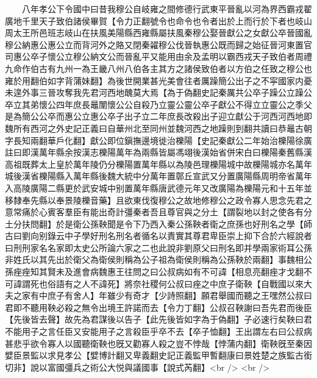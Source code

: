　　八年孝公下令國中曰昔我穆公自岐雍之間修德行武東平晉亂以河為界西霸戎翟廣地千里天子致伯諸侯畢賀【令力正翻號令也命令也令者出於上而行於下者也岐山周太王所邑班志岐山在扶風美陽縣西雍縣屬扶風秦穆公娶晉獻公之女獻公卒晉國亂穆公納惠公惠公立而背河外之賂又閉秦糴穆公伐晉執惠公既而歸之始征晉河東置官司惠公卒子懷公立穆公納文公而晉亂平又能用由余及孟明以霸西戎天子致伯者周禮九命作伯古有九州一為王畿八州八伯各主其方之諸侯致伯者以方伯之任致之穆公也雍於用翻伯如字背蒲妹翻】為後世開業甚光美會往者厲躁簡公出子之不寜國家内憂未遑外事三晉攻奪我先君河西地醜莫大焉【為于偽翻史記秦厲共公卒子躁公立躁公卒立其弟懷公四年庶長鼂闈懷公公自殺乃立靈公靈公卒子獻公不得立立靈公之季父是為簡公公卒而惠公立惠公卒子出子立二年庶長改殺出子迎立獻公于河西河西地即魏所有西河之外史記正義曰自華州北至同州並魏河西之地躁則到翻共讀曰恭鼂古朝字長知兩翻華戶化翻】獻公即位鎭撫邊境徙治櫟陽【史記秦獻公二年始治櫟陽徐廣註曰即漢萬年縣余按漢志櫟陽萬年為兩縣皆屬馮翊後漢始省併宋白曰櫟陽秦舊縣漢高祖既葬太上皇於萬年陵仍分櫟陽置萬年縣以為陵邑理櫟陽城中故櫟陽城亦名萬年城後漢省櫟陽縣入萬年縣後魏大統中分萬年置鄣丘宣武又分置廣陽縣周明帝省萬年入高陵廣陽二縣更於武安城中别置萬年縣唐武德元年又改廣陽為櫟陽元和十五年並移隸奉先縣以奉景陵櫟音藥】且欲東伐復穆公之故地修穆公之政令寡人思念先君之意常痛於心賓客羣臣有能出奇計彊秦者吾且尊官與之分土【謂裂地以封之使各有分土分扶問翻】於是衛公孫鞅聞是令下乃西入秦公孫鞅者衛之庶孫也好刑名之學【師古曰劉向别錄云中子學好刑名刑名者循名以責實其尊君卑臣崇上抑下合於六經說者曰刑刑家名名家即太史公所論六家之二也此說非劉原父曰刑名即并學兩家術耳公孫非姓氏以其先出於衛父為衛侯則稱為公子祖為衛侯則稱為公孫鞅於兩翻】事魏相公孫痤痤知其賢未及進會病魏惠王往問之曰公叔病如有不可諱【相息亮翻痤才戈翻不可諱謂死也俗語有之人不諱死】將奈社稷何公叔曰痤之中庶子衛鞅【自戰國以來大夫之家有中庶子有舍人】年雖少有奇才【少詩照翻】願君舉國而聽之王嘿然公叔曰君即不聽用鞅必殺之無令出境王許諾而去【令力丁翻】公叔召鞅謝曰吾先君而後臣【先後皆去聲】故先為君謀後以告子【此先後皆如字為于偽翻】子必速行矣鞅曰君不能用子之言任臣又安能用子之言殺臣乎卒不去【卒子恤翻】王出謂左右曰公叔病甚悲乎欲令寡人以國聽衛鞅也旣又勸寡人殺之豈不悖哉【悖蒲内翻】衛鞅旣至秦因嬖臣景監以求見孝公【嬖博計翻又卑義翻史記正義監甲暫翻康曰景姓楚之族監古銜切非】說以富國彊兵之術公大悦與議國事【說式芮翻】<br />
<br />
